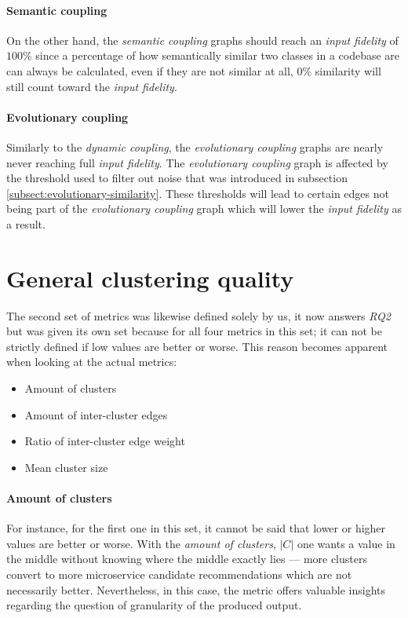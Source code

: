 \documentclass[12pt,a4paper]{report}
\begin{document}
\paragraph{Semantic coupling}
On the other hand, the \textit{semantic coupling}
graphs should reach an \textit{input fidelity} of \(100\%\) since a percentage
of how semantically similar two classes in a codebase are can always be
calculated, even if they are not similar at all, \(0\%\) similarity will still
count toward the \textit{input fidelity}.

\paragraph{Evolutionary coupling}
Similarly to the \textit{dynamic coupling},
the \textit{evolutionary coupling} graphs are nearly never reaching full
\textit{input fidelity}. The \textit{evolutionary coupling} graph is affected
by the threshold used to filter out noise that was introduced in subsection
\ref{subsect:evolutionary-similarity}. These thresholds will lead to certain
edges not being part of the \textit{evolutionary coupling} graph which will
lower the \textit{input fidelity} as a result.



\section{General clustering quality}

The second set of metrics was likewise defined solely by us, it now answers
\textit{RQ2} but was given its own set because for all four metrics in this set;
it can not be strictly defined if low values are better or worse.
This reason becomes apparent when looking at the actual metrics:
\begin{itemize}[noitemsep]
  \item Amount of clusters
  \item Amount of inter-cluster edges
  \item Ratio of inter-cluster edge weight
  \item Mean cluster size
\end{itemize}

\paragraph{Amount of clusters}
For instance, for the first one in this set, it
cannot be said that lower or higher values are better or worse. With the
\textit{amount of clusters}, \(\vert C \vert\) one wants a value in the middle
without knowing where the middle exactly lies --- more clusters convert to more
microservice candidate recommendations which are not necessarily better.
Nevertheless, in this case, the metric offers valuable insights regarding the
question of granularity of the produced output.
\end{document}
